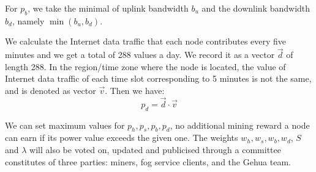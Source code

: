 For $p_b$, we take the minimal of uplink bandwidth $b_u$ and the downlink bandwidth $b_d$, namely $\min(b_u, b_d)$. 

We calculate the Internet data traffic that each node contributes every five minutes and we get a total of 288 values a day. We record it as a vector $\vec{d}$ of length 288. In the region/time zone where the node is located, the value of Internet data traffic of each time slot corresponding to 5 minutes is not the same, and is denoted as vector $\vec{v}$. Then we have: 
\begin{equation}
	p_d = \vec{d} \cdot \vec{v}
\end{equation}

We can set maximum values for $p_h, p_s, p_b, p_d$, no additional mining reward a node can earn if its power value exceeds the given one. The weights $w_h, w_s, w_b, w_d$, $S$ and $\lambda$ will also be voted on, updated and publicised through a committee constitutes of three parties: miners, fog service clients, and the Gehua team. 
